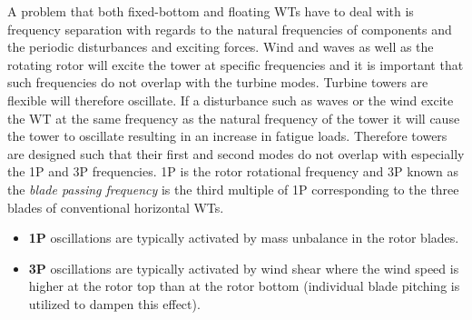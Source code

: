 A problem that both fixed-bottom and floating WTs have to deal with is frequency separation with regards to the natural frequencies of components and the periodic disturbances and exciting forces. Wind and waves as well as the rotating rotor will excite the tower at specific frequencies and it is important that such frequencies do not overlap with the turbine modes. Turbine towers are flexible will therefore oscillate. If a disturbance such as waves or the wind excite the WT at the same frequency as the natural frequency of the tower it will cause the tower to oscillate resulting in an increase in fatigue loads. Therefore towers are designed such that their first and second modes do not overlap with especially the 1P and 3P frequencies. 1P is the rotor rotational frequency and 3P known as the \textit{blade passing frequency} is the third multiple of 1P corresponding to the three blades of conventional horizontal WTs.
\begin{itemize}
	\item \textbf{1P} oscillations are typically activated by mass unbalance in the rotor blades.
	\item \textbf{3P} oscillations are typically activated by wind shear where the wind speed is higher at the rotor top than at the rotor bottom (individual blade pitching is utilized to dampen this effect).
\end{itemize}

